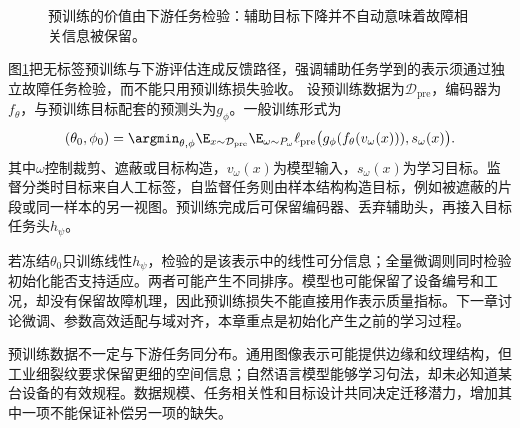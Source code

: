 \begin{figure}[htbp]
\centering
{}
\caption{预训练的价值由下游任务检验：辅助目标下降并不自动意味着故障相关信息被保留。}
\label{fig:pretraining-downstream-validation}
\end{figure}
图\ref{fig:pretraining-downstream-validation}把无标签预训练与下游评估连成反馈路径，强调辅助任务学到的表示须通过独立故障任务检验，而不能只用预训练损失验收。
设预训练数据为$\mathcal D_{\mathrm{pre}}$，编码器为$f_\theta$，与预训练目标配套的预测头为$g_\phi$。一般训练形式为
\begin{equation}
 (\theta_0,\phi_0)=\argmin_{\theta,\phi}
 \E_{x\sim\mathcal D_{\mathrm{pre}}}
 \E_{\omega\sim P_\omega}
 \ell_{\mathrm{pre}}\bigl(g_\phi(f_\theta(v_\omega(x))),s_\omega(x)\bigr).
\end{equation}
其中$\omega$控制裁剪、遮蔽或目标构造，$v_\omega(x)$为模型输入，$s_\omega(x)$为学习目标。监督分类时目标来自人工标签，自监督任务则由样本结构构造目标，例如被遮蔽的片段或同一样本的另一视图。预训练完成后可保留编码器、丢弃辅助头，再接入目标任务头$h_\psi$。

若冻结$\theta_0$只训练线性$h_\psi$，检验的是该表示中的线性可分信息；全量微调则同时检验初始化能否支持适应。两者可能产生不同排序。模型也可能保留了设备编号和工况，却没有保留故障机理，因此预训练损失不能直接用作表示质量指标。下一章讨论微调、参数高效适配与域对齐，本章重点是初始化产生之前的学习过程。

预训练数据不一定与下游任务同分布。通用图像表示可能提供边缘和纹理结构，但工业细裂纹要求保留更细的空间信息；自然语言模型能够学习句法，却未必知道某台设备的有效规程。数据规模、任务相关性和目标设计共同决定迁移潜力，增加其中一项不能保证补偿另一项的缺失。

